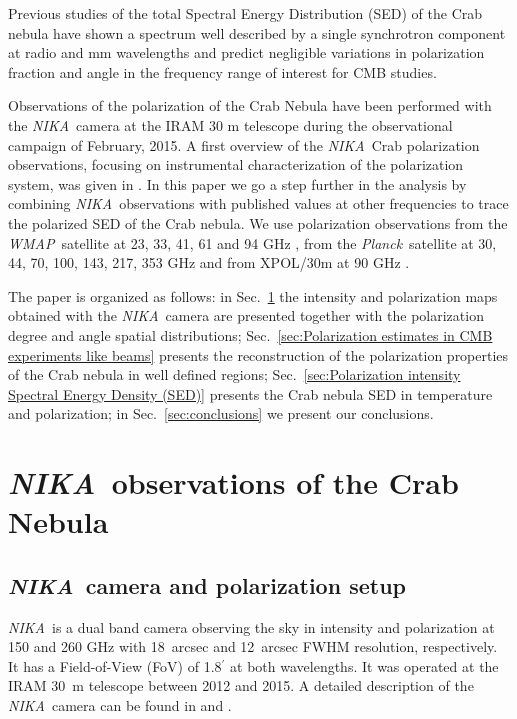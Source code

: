 \documentclass[twocolumn,traditabstract]{aa}
\def\NIKA{\textit{NIKA}}
\def\Planck{\textit{Planck}}
\def\WMAP{\textit{WMAP}}
\begin{document}

Previous studies \citep{macias2010} of the total Spectral Energy Distribution
(SED) of the Crab nebula have shown a spectrum well described by a single
synchrotron component at radio and mm wavelengths and predict negligible
variations in polarization fraction and angle in the frequency range of interest
for CMB studies.
 
Observations of the polarization of the Crab Nebula have been performed with the
\NIKA\ camera \citep{monfardini2010,catalano2014,monfardini2014} at the IRAM 30
m telescope during the observational campaign of February, 2015. A first
overview of the \NIKA\ Crab polarization observations,
focusing on instrumental characterization of the polarization system, was given in
\cite{2016JLTP..184..724R}. In this paper we go a step further in the analysis
by combining \NIKA\ observations with published values at other frequencies to trace the
polarized SED of the Crab nebula. We use polarization observations from the \WMAP\
satellite at 23, 33, 41, 61 and 94 GHz \citep{2011ApJS..192...19W}, from the
\Planck\ satellite at 30, 44, 70, 100, 143, 217, 353 GHz and from XPOL/30m at 90 GHz
\citep{aumont2010}. 

The paper is organized as follows: in Sec.~\ref{sec:NIKA observations} the
intensity and polarization maps obtained with the \NIKA\ camera are presented
together with the polarization degree and angle spatial distributions;
Sec.~\ref{sec:Polarization estimates in CMB experiments like beams} presents the
reconstruction of the polarization properties of the Crab nebula in well defined
regions; Sec.~\ref{sec:Polarization intensity Spectral Energy Density (SED)}
presents the Crab nebula SED in temperature and polarization; in
Sec.~\ref{sec:conclusions} we present our conclusions.
 
\section{\NIKA\ observations of the Crab Nebula}\label{sec:NIKA observations}
\subsection{\NIKA\ camera and polarization setup}\label{sec:nika camera}
\NIKA\ is a dual band camera observing the sky in intensity and polarization at
150 and 260 GHz with 18~arcsec and 12~arcsec FWHM resolution, respectively. It
has a Field-of-View (FoV) of 1.8$^{\prime}$ at both wavelengths. It was operated at the
IRAM 30~m telescope between 2012 and 2015. A detailed description of the
\NIKA\ camera can be found in \citet{monfardini2010, monfardini2011} and
\citet{catalano2014}.
\end{document}
